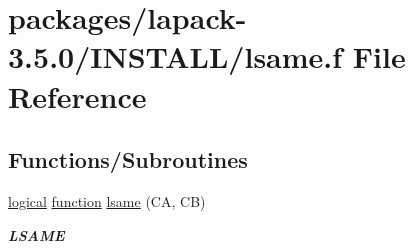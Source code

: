 \hypertarget{lapack-3_85_80_2INSTALL_2lsame_8f}{}\section{packages/lapack-\/3.5.0/\+I\+N\+S\+T\+A\+L\+L/lsame.f File Reference}
\label{lapack-3_85_80_2INSTALL_2lsame_8f}
\subsection*{Functions/\+Subroutines}
\begin{DoxyCompactItemize}
\item 
\hyperlink{tnc_8c_aa7b64cdf39500931f7b333343791a104}{logical} \hyperlink{afunc_8m_a7b5e596df91eadea6c537c0825e894a7}{function} \hyperlink{group__auxOTHERauxiliary_gada799b40a93f1fd2c6d1a86a95f21631}{lsame} (C\+A, C\+B)
\begin{DoxyCompactList}\small\item\em {\bfseries L\+S\+A\+M\+E} \end{DoxyCompactList}\end{DoxyCompactItemize}
